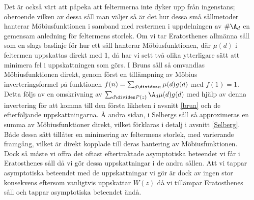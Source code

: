 Det är också värt att påpeka att feltermerna inte dyker upp från ingenstans; oberoende vilken av dessa såll man väljer så är det hur dessa små sållmetoder hanterar Möbiusfunktionen i samband med restermen i uppdelningen av \(\#\A_d\) en gemensam anledning för feltermens storlek.
Om vi tar Eratosthenes allmänna såll som en slags baslinje för hur ett såll hanterar Möbiusfunktionen, där \(\mu(d)\) i feltermen uppskattas direkt med 1, då har vi sett två olika ytterligare sätt att minimera fel i uppskattningen som görs. 
I Bruns såll så omvandlas Möbiusfunktionen direkt, genom först en tillämpning av Möbius inverteringsformel på funktionen \(f(n) = \sum_{d\divides n}\mu(d)g(d)\) med \(f(1) = 1\). 
Detta följs av en omskrivning av \(\sum_{d\divides P(z)}\A_d \mu(d) g(d)\) med hjälp av denna invertering för att komma till den första likheten i avsnitt \ref{brun} och de efterföljande uppskattningarna. 
Å andra sidan, i Selbergs såll så approximeras en summa av Möbiusfunktioner direkt, vilket förklaras i detalj i avsnitt \ref{Selberg}.
Både dessa sätt tillåter en minimering av feltermens storlek, med varierande framgång, vilket är direkt kopplade till deras hantering av Möbiusfunktionen.
Dock så måste vi offra det oftast eftertraktade asymptotiska beteendet vi får i Eratosthenes såll då vi gör dessa uppskattningar i de andra sållen.
Att vi tappar asymptotiska beteendet med de uppskattningar vi gör är dock av ingen stor konsekvens eftersom vanligtvis uppskattar \(W(z)\) då vi tillämpar Eratosthenes såll och tappar asymptotiska beteendet ändå.


